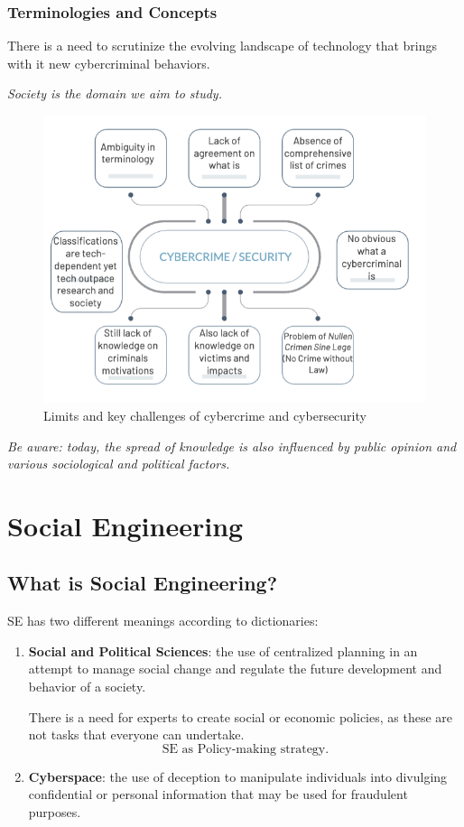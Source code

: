 \subsection{Terminologies and Concepts}

\raggedright
There is a need to scrutinize the evolving landscape of technology that brings with it new cybercriminal behaviors.

\raggedleft \textit{Society is the domain we aim to study.}

\begin{figure}[H]
    \centering
    \includegraphics[width=0.5\linewidth]{Images/Sociology/securityLimits.png}
    \caption{Limits and key challenges of cybercrime and cybersecurity}
    \label{fig:cyberLimits}
\end{figure}

\centering
\textit{Be aware: today, the spread of knowledge is also influenced by public opinion and various sociological and political factors.}
\raggedright

\chapter{Social Engineering}

\section*{What is Social Engineering?}

SE has two different meanings according to dictionaries: 
\begin{enumerate}
    \item \textbf{Social and Political Sciences}: the use of centralized planning in an attempt to manage social change and regulate the future development and behavior of a society.
    
    \vspace{0.1cm}

    There is a need for experts to create social or economic policies, as these are not tasks that everyone can undertake.
    \[
        \text{SE as Policy-making strategy.}
    \]
    \item \textbf{Cyberspace}: the use of deception to manipulate individuals into divulging confidential or personal information that may be used for fraudulent purposes.
\end{enumerate}

